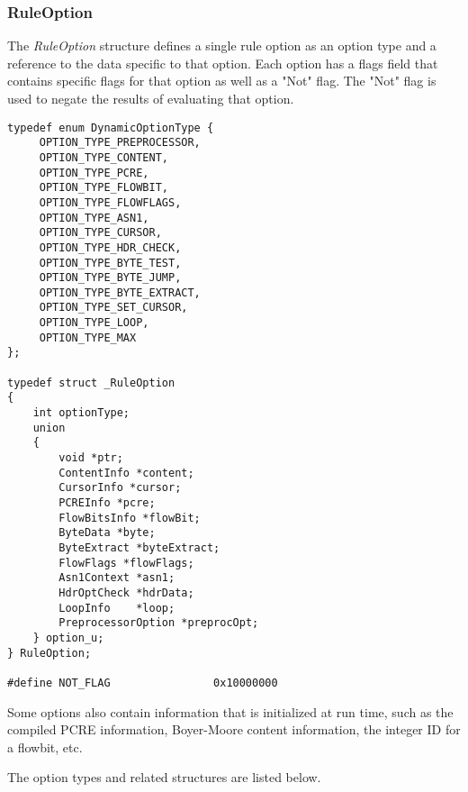\documentclass[english]{report}
\begin{document}
\subsubsection{RuleOption}

The {\em RuleOption} structure defines a single rule option as an option type
and a reference to the data specific to that option.  Each option has a flags
field that contains specific flags for that option as well as a "Not" flag.
The "Not" flag is used to negate the results of evaluating that option.

\begin{verbatim}
typedef enum DynamicOptionType {
     OPTION_TYPE_PREPROCESSOR,
     OPTION_TYPE_CONTENT,
     OPTION_TYPE_PCRE,
     OPTION_TYPE_FLOWBIT,
     OPTION_TYPE_FLOWFLAGS,
     OPTION_TYPE_ASN1,
     OPTION_TYPE_CURSOR,
     OPTION_TYPE_HDR_CHECK,
     OPTION_TYPE_BYTE_TEST,
     OPTION_TYPE_BYTE_JUMP,
     OPTION_TYPE_BYTE_EXTRACT,
     OPTION_TYPE_SET_CURSOR,
     OPTION_TYPE_LOOP,
     OPTION_TYPE_MAX
};

typedef struct _RuleOption
{
    int optionType;
    union
    {   
        void *ptr;
        ContentInfo *content;
        CursorInfo *cursor;
        PCREInfo *pcre;
        FlowBitsInfo *flowBit;
        ByteData *byte;
        ByteExtract *byteExtract;
        FlowFlags *flowFlags;
        Asn1Context *asn1;
        HdrOptCheck *hdrData;
        LoopInfo    *loop;
        PreprocessorOption *preprocOpt;
    } option_u;
} RuleOption;

#define NOT_FLAG                0x10000000
\end{verbatim}

Some options also contain information that is initialized at run time, such as
the compiled PCRE information, Boyer-Moore content information, the integer ID
for a flowbit, etc.

The option types and related structures are listed below.
\end{document}
